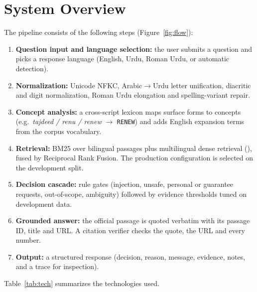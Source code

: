 \documentclass[12pt,a4paper]{article}
\begin{document}
\section{System Overview}
The pipeline consists of the following steps (Figure~\ref{fig:flow}):

\begin{enumerate}
    \item \textbf{Question input and language selection:} the user submits a question and picks a response language
          (English, Urdu, Roman Urdu, or automatic detection).
    \item \textbf{Normalization:} Unicode NFKC, Arabic$\to$Urdu letter unification, diacritic and digit normalization,
          Roman Urdu elongation and spelling-variant repair.
    \item \textbf{Concept analysis:} a cross-script lexicon maps surface forms to concepts (e.g.\ \textit{tajdeed / renu /
          renew} $\to$ \texttt{RENEW}) and adds English expansion terms from the corpus vocabulary.
    \item \textbf{Retrieval:} BM25 over bilingual passages plus multilingual dense retrieval (\RDenseModel), fused by
          Reciprocal Rank Fusion. The production configuration is selected on the development split.
    \item \textbf{Decision cascade:} rule gates (injection, unsafe, personal or guarantee requests, out-of-scope, ambiguity)
          followed by evidence thresholds tuned on development data.
    \item \textbf{Grounded answer:} the official passage is quoted verbatim with its passage ID, title and URL. A citation
          verifier checks the quote, the URL and every number.
    \item \textbf{Output:} a structured response (decision, reason, message, evidence, notes, and a trace for inspection).
\end{enumerate}

Table~\ref{tab:tech} summarizes the technologies used.
\end{document}
